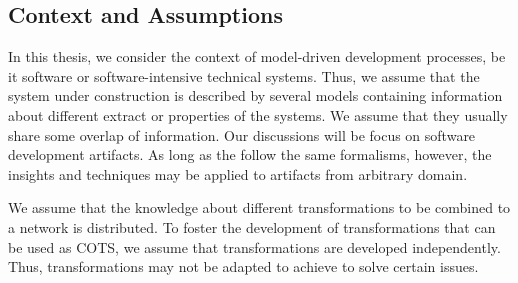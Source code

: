 






\subsection{Context and Assumptions}
\label{chap:introduction:objective:assumptions}

In this thesis, we consider the context of model-driven development processes, be it software or software-intensive technical systems.
Thus, we assume that the system under construction is described by several models containing information about different extract or properties of the systems.
We assume that they usually share some overlap of information.
Our discussions will be focus on software development artifacts.
As long as the follow the same formalisms, however, the insights and techniques may be applied to artifacts from arbitrary domain.

We assume that the knowledge about different transformations to be combined to a network is distributed.
To foster the development of transformations that can be used as \gls{COTS}, we assume that transformations are developed independently.
Thus, transformations may not be adapted to achieve to solve certain issues.

